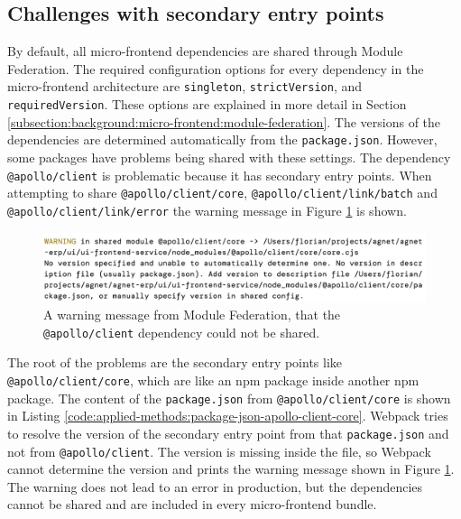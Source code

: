 \subsection{Challenges with secondary entry points}\label{subsection:applied-methods:prototypical-implementation:sharing
-secondary-entrypoints}

By default, all micro-frontend dependencies are shared through Module Federation. The required configuration options for every dependency in the micro-frontend architecture are \texttt{singleton}, \texttt{strictVersion}, and \texttt{requiredVersion}. These options are explained in more detail in Section \ref{subsection:background:micro-frontend:module-federation}. The versions of the dependencies are determined automatically from the \texttt{package.json}. However, some packages have problems being shared with these settings. The dependency \texttt{@apollo/client} is problematic because it has secondary entry points. When attempting to share \texttt{@apollo/client/core}, \texttt{@apollo/client/link/batch} and \texttt{@apollo/client/link/error} the warning message in Figure \ref{fig:applied-methods:sharing-secondary-entrypoints-error} is shown.

\ifshowImages
\begin{figure}[H]
  \centering
  \includegraphics[width=1\linewidth]{images/applied-methods/prototypical-implementation/module-federation-apollo-warning.jpg}
  \caption{A warning message from Module Federation, that the \texttt{@apollo/client} dependency could not be shared.}\label{fig:applied-methods:sharing-secondary-entrypoints-error}
\end{figure}
\fi

\noindent The root of the problems are the secondary entry points like \texttt{@apollo/client/core}, which are like an npm package inside another npm package. The content of the \texttt{package.json} from \texttt{@apollo/client/core} is shown in Listing \ref{code:applied-methods:package-json-apollo-client-core}. Webpack tries to resolve the version of the secondary entry point from that \texttt{package.json} and not from \texttt{@apollo/client}. The version is missing inside the file, so Webpack cannot determine the version and prints the warning message shown in Figure \ref{fig:applied-methods:sharing-secondary-entrypoints-error}. The warning does not lead to an error in production, but the dependencies cannot be shared and are included in every micro-frontend bundle.

